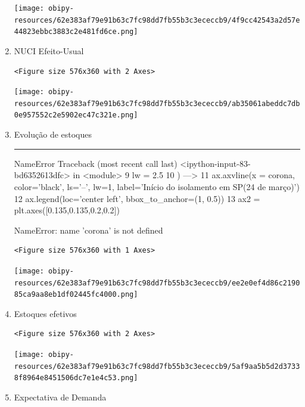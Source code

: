 \documentclass[11pt]{article}
\begin{document}
\begin{enumerate}
\begin{center}
\texttt{[image: obipy-resources/62e383af79e91b63c7fc98dd7fb55b3c3ececcb9/4f9cc42543a2d57e44823ebbc3883c2e481fd6ce.png]}
\end{center}

\item NUCI Efeito-Usual
\label{sec:org2a99217}

\begin{verbatim}
<Figure size 576x360 with 2 Axes>
\end{verbatim}


\begin{center}
\texttt{[image: obipy-resources/62e383af79e91b63c7fc98dd7fb55b3c3ececcb9/ab35061abeddc7db0e957552c2e5902ec47c321e.png]}
\end{center}

\item Evolução de estoques
\label{sec:org14cc93d}

\noindent\rule{\textwidth}{0.5pt}
NameError                                 Traceback (most recent call last)
<ipython-input-83-bd6352613dfc> in <module>
      9     lw = 2.5
     10 )
---> 11 ax.axvline(x = corona, color='black', ls='--', lw=1, label='Início do isolamento em SP\n(24 de março)')
     12 ax.legend(loc='center left', bbox\_to\_anchor=(1, 0.5))
     13 ax2 = plt.axes([0.135,0.135,0.2,0.2])

NameError: name 'corona' is not defined

\begin{verbatim}
<Figure size 576x360 with 1 Axes>
\end{verbatim}


\begin{center}
\texttt{[image: obipy-resources/62e383af79e91b63c7fc98dd7fb55b3c3ececcb9/ee2e0ef4d86c219085ca9aa8eb1df02445fc4000.png]}
\end{center}

\item Estoques efetivos
\label{sec:orgcb3ca78}

\begin{verbatim}
<Figure size 576x360 with 2 Axes>
\end{verbatim}


\begin{center}
\texttt{[image: obipy-resources/62e383af79e91b63c7fc98dd7fb55b3c3ececcb9/5af9aa5b5d2d37338f8964e8451506dc7e1e4c53.png]}
\end{center}

\item Expectativa de Demanda
\label{sec:orgd477b6c}


\end{enumerate}
\end{document}
